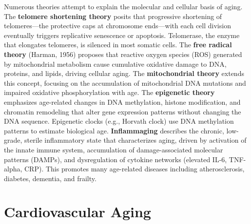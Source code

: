 Numerous theories attempt to explain the molecular and cellular basis of aging. The \textbf{telomere shortening theory} posits that progressive shortening of telomeres---the protective caps at chromosome ends---with each cell division eventually triggers replicative senescence or apoptosis. Telomerase, the enzyme that elongates telomeres, is silenced in most somatic cells. The \textbf{free radical theory} (Harman, 1956) proposes that reactive oxygen species (ROS) generated by mitochondrial metabolism cause cumulative oxidative damage to DNA, proteins, and lipids, driving cellular aging. The \textbf{mitochondrial theory} extends this concept, focusing on the accumulation of mitochondrial DNA mutations and impaired oxidative phosphorylation with age. The \textbf{epigenetic theory} emphasizes age-related changes in DNA methylation, histone modification, and chromatin remodeling that alter gene expression patterns without changing the DNA sequence. Epigenetic clocks (e.g., Horvath clock) use DNA methylation patterns to estimate biological age. \textbf{Inflammaging} describes the chronic, low-grade, sterile inflammatory state that characterizes aging, driven by activation of the innate immune system, accumulation of damage-associated molecular patterns (DAMPs), and dysregulation of cytokine networks (elevated IL-6, TNF-alpha, CRP). This promotes many age-related diseases including atherosclerosis, diabetes, dementia, and frailty.

\section{Cardiovascular Aging}








\label{sec:Cardiovascular Aging}

